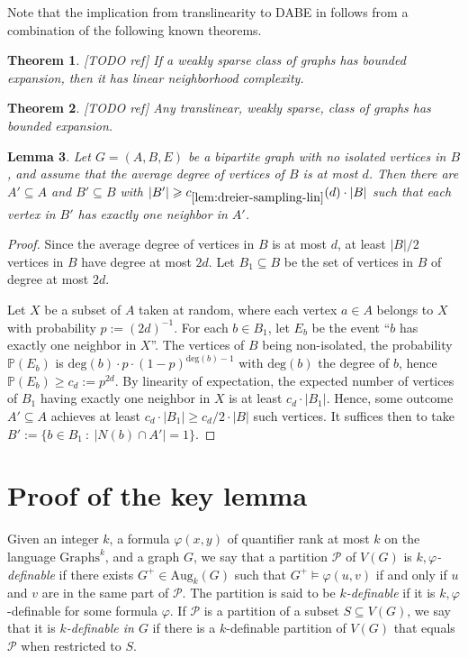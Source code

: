 \documentclass[11pt]{article}
\newtheorem{theorem}{Theorem}
\newtheorem{lemma}[theorem]{Lemma}
\theoremstyle{definition}
\renewcommand{\ge}{\geqslant}
\renewcommand{\subset}{\subseteq}
\let\phi\varphi
\newcommand{\Pp}{\mathcal{P}}
\newcommand{\remph}[1]{{\color{red} \emph{#1}}}
\newcommand{\Aug}{\text{Aug}}
\newcommand{\Graphs}{\mathrm{Graphs}}
\begin{document}
Note that the implication from translinearity to DABE in  follows from a combination of the following known theorems.

\begin{theorem}\label{thm:bddexp2nc}[TODO ref]
  If a weakly sparse class of graphs has bounded expansion, then it has linear neighborhood complexity.
\end{theorem}

\begin{theorem}\label{thm:sparsenc2bddexp}[TODO ref]
  Any translinear, weakly sparse, class of graphs has bounded expansion.
\end{theorem}

\begin{lemma}\label{lem:dreier-sampling-lin}
Let $G = (A, B, E)$ be a bipartite graph with no isolated vertices in $B$, and assume that the average degree of vertices of $B$ is at most $d$.
Then there are $A' \subseteq A$ and $B' \subseteq B$ with $|B'| \ge c_{\ref{lem:dreier-sampling-lin}}(d) \cdot |B|$ such that each vertex in $B'$ has exactly one neighbor in $A'$.
\end{lemma}
\begin{proof}
Since the average degree of vertices in $B$ is at most $d$, at least $|B|/2$ vertices in $B$ have degree at most $2d$.
Let $B_1 \subset B$ be the set of vertices in $B$ of degree at most $2d$.

Let $X$ be a subset of $A$ taken at random, where each vertex $a \in A$ belongs to $X$ with probability $p :=(2d)^{-1}$.
For each $b \in B_1$, let $E_b$ be the event ``$b$ has exactly one neighbor in $X$''.
The vertices of $B$ being non-isolated, the probability $\mathbb{P}(E_b)$ is $\text{deg}(b) \cdot p \cdot (1 - p)^{\text{deg}(b) - 1}$ with $\text{deg}(b)$ the degree of $b$, hence $\mathbb{P}(E_b) \ge c_d := p^{2d}$.
By linearity of expectation, the expected number of vertices of $B_1$ having exactly one neighbor in $X$ is at least $c_d \cdot |B_1|$.
Hence, some outcome $A' \subset A$ achieves at least $c_d \cdot |B_1| \ge c_d/2 \cdot |B|$ such vertices.
It suffices then to take $B' := \{b \in B_1 ~:~ |N(b) \cap A'| = 1\}$.
\end{proof}

\section{Proof of the key lemma}

Given an integer $k$, a formula $\phi(x, y)$ of quantifier rank at most $k$ on the language $\Graphs^k$, and a graph $G$, we say that a partition $\mathcal P$ of $V(G)$ is \remph{$k, \phi$-definable} if there exists $G^+ \in \Aug_k(G)$ such that $G^+ \models \phi(u, v)$ if and only if $u$ and $v$ are in the same part of $\mathcal P$.
The partition is said to be \remph{$k$-definable} if it is $k, \phi$-definable for some formula $\phi$.
If $\Pp$ is a partition of a subset $S \subseteq V(G)$, we say that it is \remph{$k$-definable in $G$} if there is a $k$-definable partition of $V(G)$ that equals $\Pp$ when restricted to $S$.
\end{document}
